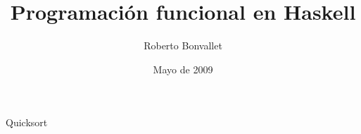 \documentclass[12pt]{beamer}
\title {Programación funcional en Haskell}
\author{Roberto Bonvallet}
\institute[]{
    Departamento de Informática \\
    Universidad Técnica Federico Santa María
}
\date{Mayo de 2009}
\begin{document}
\begin{frame}
    \titlepage
\end{frame}
    
\begin{frame}[fragile]
    
\end{frame}

\begin{frame}[fragile]
    
\end{frame}

\begin{frame}[fragile]
    
\end{frame}

\begin{frame}[fragile]
    
\end{frame}

\begin{frame}[fragile]
    \begin{block}{Quicksort}
        
    \end{block}
\end{frame}
\end{document}
